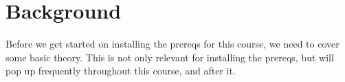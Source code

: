 \chapter{Background}

Before we get started on installing the prereqs for this course, we need to cover some basic theory. This is not only relevant for installing the prereqs, but will pop up frequently throughout this course, and after it.









